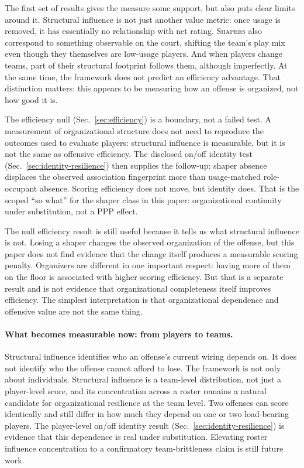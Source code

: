 \documentclass[11pt]{article}
\begin{document}
The first set of results gives the measure some support, but also puts clear limits around it.
Structural influence is not just another value metric: once usage is removed, it has
essentially no relationship with net rating. \textsc{Shapers} also correspond to something
observable on the court, shifting the team's play mix even though they themselves are
low-usage players. And when players change teams, part of their structural footprint follows
them, although imperfectly. At the same time, the framework does not predict an efficiency
advantage. That distinction matters: this appears to be measuring how an offense is
organized, not how good it is.

The efficiency null (Sec.~\ref{sec:efficiency}) is a boundary, not a failed test. A
measurement of organizational structure does not need to reproduce the outcomes used to
evaluate players: structural influence is measurable, but it is not the same as offensive
efficiency. The disclosed on/off identity test (Sec.~\ref{sec:identity-resilience}) then
supplies the follow-up: shaper absence displaces the observed association fingerprint more
than usage-matched role-occupant absence. Scoring efficiency does not move, but identity does.
That is the scoped ``so what'' for the shaper class in this paper: organizational continuity
under substitution, not a PPP effect.

The null efficiency result is still useful because it tells us what structural influence is
not. Losing a shaper changes the observed organization of the offense, but this paper does not
find evidence that the change itself produces a measurable scoring penalty. Organizers are
different in one important respect: having more of them on the floor is associated with higher
scoring efficiency. But that is a separate result and is not evidence that organizational
completeness itself improves efficiency. The simplest interpretation is that organizational
dependence and offensive value are not the same thing.

\paragraph{What becomes measurable now: from players to teams.}
Structural influence identifies who an offense's current wiring depends on. It does not
identify who the offense cannot afford to lose. The framework is not only about individuals.
Structural influence is a team-level distribution, not just a player-level score, and its
concentration across a roster remains a natural candidate for organizational resilience at the
team level. Two offenses can score identically and still differ in how much they depend on one
or two load-bearing players. The player-level on/off identity result
(Sec.~\ref{sec:identity-resilience}) is evidence that this dependence is real under
substitution. Elevating roster influence concentration to a confirmatory team-brittleness
claim is still future work.
\end{document}
